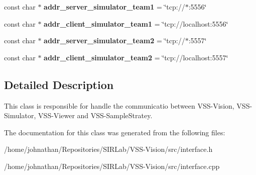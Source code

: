 \begin{DoxyCompactItemize}
\item 
const char $\ast$ {\bfseries addr\+\_\+server\+\_\+simulator\+\_\+team1} = \char`\"{}tcp\+://$\ast$\+:5556\char`\"{}\hypertarget{classInterface_a4315a24cd5d7156ccb6da180cc5a825e}{}\label{classInterface_a4315a24cd5d7156ccb6da180cc5a825e}

\item 
const char $\ast$ {\bfseries addr\+\_\+client\+\_\+simulator\+\_\+team1} = \char`\"{}tcp\+://localhost\+:5556\char`\"{}\hypertarget{classInterface_aa05d667c54fc41c5dc6fe7aa8a85ef5d}{}\label{classInterface_aa05d667c54fc41c5dc6fe7aa8a85ef5d}

\item 
const char $\ast$ {\bfseries addr\+\_\+server\+\_\+simulator\+\_\+team2} = \char`\"{}tcp\+://$\ast$\+:5557\char`\"{}\hypertarget{classInterface_ae358e6d8cb691934a5dc23c4a718082b}{}\label{classInterface_ae358e6d8cb691934a5dc23c4a718082b}

\item 
const char $\ast$ {\bfseries addr\+\_\+client\+\_\+simulator\+\_\+team2} = \char`\"{}tcp\+://localhost\+:5557\char`\"{}\hypertarget{classInterface_adad17a36b3382235441861a3648bd807}{}\label{classInterface_adad17a36b3382235441861a3648bd807}

\end{DoxyCompactItemize}


\subsection{Detailed Description}
This class is responsible for handle the communicatio between V\+S\+S-\/\+Vision, V\+S\+S-\/\+Simulator, V\+S\+S-\/\+Viewer and V\+S\+S-\/\+Sample\+Stratey. 

The documentation for this class was generated from the following files\+:\begin{DoxyCompactItemize}
\item 
/home/johnathan/\+Repositories/\+S\+I\+R\+Lab/\+V\+S\+S-\/\+Vision/src/interface.\+h\item 
/home/johnathan/\+Repositories/\+S\+I\+R\+Lab/\+V\+S\+S-\/\+Vision/src/interface.\+cpp\end{DoxyCompactItemize}
